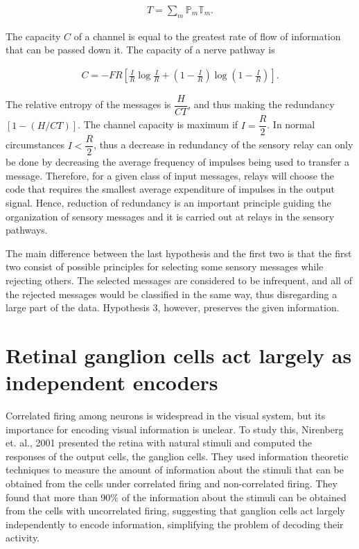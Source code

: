 \documentclass[twoside]{article}
\begin{document}
\begin{multicols}{2}
\begin{align} \label{eq:2}
	T = \sum_m \mathbb{P}_m \mathbb{T}_m.
\end{align}

The capacity $C$ of a channel is equal to the greatest rate of flow of information that can be passed down it. The capacity of a nerve pathway is

\begin{align} \label{eq:3}
	C = - FR \left[\frac{I}{R} \log \frac{I}{R} +\left(1-\frac{I}{R} \right) \log  \left(1-\frac{I}{R} \right) \right].
\end{align}

The relative entropy of the messages is $\dfrac{H}{CT}$, and thus making the redundancy $[1-(H/CT)]$. The channel capacity is maximum if $I = \dfrac{R}2$. In normal circumstances $I < \dfrac{R}{2}$, thus a decrease in redundancy of the sensory relay can only be done by decreasing the average frequency of impulses being used to transfer a message. Therefore, for a given class of input messages, relays will choose the code that requires the smallest average expenditure of impulses in the output signal. Hence, reduction of redundancy is an important principle guiding the organization of sensory messages and it is carried out at relays in the sensory pathways.

The main difference between the last hypothesis and the first two is that the first two consist of possible principles for selecting some sensory messages while rejecting others. The selected messages are considered to be infrequent, and all of the rejected messages would be classified in the same way, thus disregarding a large part of the data. Hypothesis 3, however, preserves the given information.








\section{Retinal ganglion cells act largely as independent encoders}

\footnotesize
Correlated firing among neurons is widespread in the visual system, but its importance for encoding visual information is unclear. To study this, Nirenberg et. al., 2001 presented the retina with natural stimuli and computed the responses of the output cells, the ganglion cells. They used information theoretic techniques to measure the amount of information about the stimuli that can be obtained from the cells under correlated firing and non-correlated firing. They found that more than 90\% of the information about the stimuli can be obtained from the cells with uncorrelated firing, suggesting that ganglion cells act largely independently to encode information, simplifying the problem of decoding their activity. 


\end{multicols}
\end{document}
